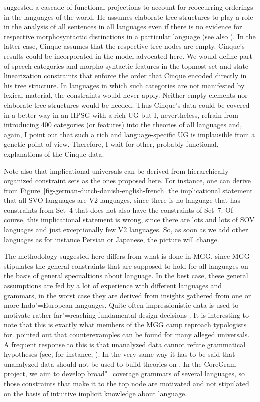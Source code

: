  suggested a cascade of functional projections to account for
reoccurring orderings in the languages of the world. He assumes elaborate tree structures to play a
role in the analysis of all sentences in all languages even if there is no evidence for respective
morphosyntactic distinctions in a particular language (see also \citealp[]{CR2010a}). In the
latter case, Cinque assumes that the respective tree nodes are empty. Cinque's results could be
incorporated in the model advocated here. We would define part of speech categories and
morpho-syntactic features in the topmost set and state linearization constraints that enforce the
order that Cinque encoded directly in his tree structure. In languages in which such categories are
not manifested by lexical material, the constraints would never apply. Neither empty elements nor
elaborate tree structures would be needed. Thus Cinque's data could be
covered in a better way in an HPSG with a rich UG but I, nevertheless, refrain from introducing 400 categories (or
features) into the theories of all languages and, again, I point out that such a rich and
language-specific UG is implausible from a genetic point of view. Therefore, I wait for other, probably functional, explanations of the Cinque data.

Note also that implicational universals can be derived from hierarchically organized constraint sets
as the ones proposed here. For instance, one
can derive from Figure~\ref{fig-german-dutch-danish-english-french} the implicational statement that
all SVO languages are V2 languages, since there is no language that has constraints from Set~4 that
does not also have the constraints of Set~7. Of course, this implicational statement is wrong, since there are
lots and lots of SOV languages and just exceptionally few V2 languages. So, as soon as we add other
languages as for instance Persian or Japanese, the picture will change.

The methodology suggested here differs from what is done in MGG, since MGG stipulates the general
constraints that are supposed to hold for all languages on the basis of general specualtions about
language. In the best case, these general assumptions are fed by a lot of experience with different
languages and grammars, in the worst case they are derived from insights gathered from one or more
Indo"=European languages. Quite often impressionistic data is used to motivate rather far"=reaching
fundamental design decisions \citep{Fanselow2009a,SR2012a,Haider2016a}. It is interesting to note
that this is exactly what members of the MGG camp reproach typologists for. \citet{EL2009a} pointed out
that counterexamples can be found for many alleged universals. A frequent response to this is that
unanalyzed data cannot refute grammatical hypotheses (see, for instance, \citealp[]{Freidin2009a}). In the very same way it has to be said that unanalyzed data should not be
used to build theories on \citep{Fanselow2009a}. In the CoreGram project, we aim to develop
broad"=coverage grammars of several languages, so those constraints that make it to the top node are
motivated and not stipulated on the basis of intuitive implicit knowledge about language.

